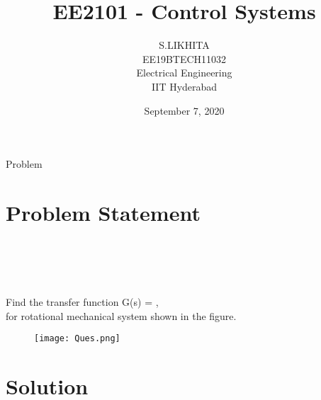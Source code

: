 \documentclass{beamer}
\title{EE2101 - Control Systems}
\author{ S.LIKHITA \\ EE19BTECH11032 \\Electrical Engineering\\IIT Hyderabad}
\date{September 7, 2020}
\theoremstyle{remark}
\numberwithin{equation}{section}
\begin{document}
\begin{frame}
\titlepage
\end{frame}

\begin{frame}

\tableofcontents
\end{frame}
\begin{frame}{Problem}
\section{Problem Statement}
\\ \ \ \\
\\ \ \ \\
Find the transfer function G(s) = {},
\\
for rotational mechanical system shown in the figure.
\begin{figure}
    \texttt{[image: Ques.png]}
    \label{fig:my_label}
\end{figure}
\end{frame}
\section{Solution}
\end{document}
